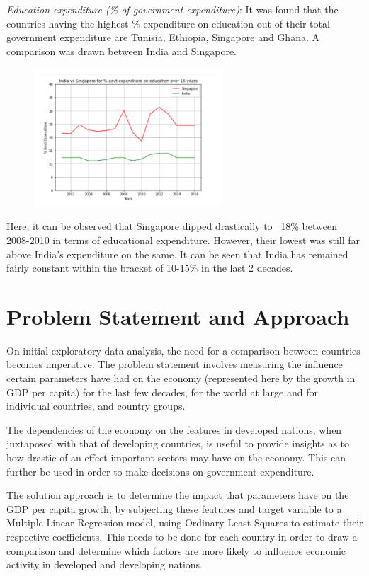 \documentclass[conference]{IEEEtran}
\begin{document}
\textit{Education expenditure (\% of government expenditure)}: It was found that the countries having the highest \% expenditure on education out of their total government expenditure are Tunisia, Ethiopia, Singapore and Ghana. A comparison was drawn between India and Singapore.

\begin{figure}[htp]
    \centering
    \includegraphics[width=7cm]{indsing.png}
    \label{fig:my_label}
\end{figure}

Here, it can be observed that Singapore dipped drastically to ~18\% between 2008-2010 in terms of educational expenditure. However, their lowest was still far above India’s expenditure on the same. It can be seen that India has remained fairly constant within the bracket of 10-15\% in the last 2 decades.



\section{Problem Statement and Approach}

On initial exploratory data analysis, the need for a comparison between countries becomes imperative. The problem statement involves measuring the influence certain parameters have had on the economy (represented here by the growth in GDP per capita) for the last few decades, for the world at large and for individual countries, and country groups. 

The dependencies of the economy on the features in developed nations, when juxtaposed with that of developing countries, is useful to provide insights as to how drastic of an effect important sectors may have on the economy. This can further be used in order to make decisions on government expenditure. 

The solution approach is to determine the impact that  parameters have on the GDP per capita growth, by subjecting these features and target variable to a Multiple Linear Regression model, using Ordinary Least Squares to estimate their respective coefficients. This needs to be done for each country in order to draw a comparison and determine which factors are more likely to influence economic activity in developed and developing nations. 
\end{document}
